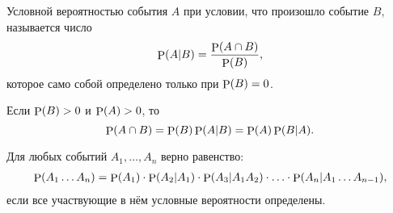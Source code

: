 \begin{to_def}
    Условной вероятностью события $A$ при условии, что произошло событие $B$, называется число
    \begin{equation*}
        \P(A|B) = \frac{\P(A \cap B)}{\P (B)},
    \end{equation*}
    которое само собой определено только при $\P(B) = 0$.
\end{to_def}

\begin{to_thr}[]
    Если $\P (B) > 0$ и $\P (A) > 0$, то
    \begin{equation*}
        \P (A \cap B) = \P(B) \P (A | B) = \P (A) \P (B | A).
    \end{equation*}
\end{to_thr}

\begin{to_thr}[]
    Для любых событий $A_1, \ldots, A_n$ верно равенство:
    \begin{align*}
        \P (A_1 \ldots A_n) = \P (A_1) \cdot \P(A_2 | A_1) \cdot \P(A_3 | A_1 A_2) \cdot \ldots \cdot
        \P(A_n | A_1 \ldots A_{n-1}), 
    \end{align*}
    если все участвующие в нём условные вероятности определены.
\end{to_thr}